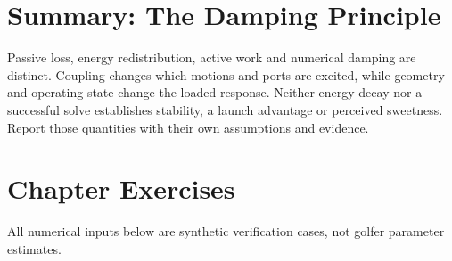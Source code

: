 \section{Summary: The Damping
Principle}\label{summary-the-damping-principle}

Passive loss, energy redistribution, active work and numerical damping are distinct. Coupling changes which motions and ports are excited, while geometry and operating state change the loaded response. Neither energy decay nor a successful solve establishes stability, a launch advantage or perceived sweetness. Report those quantities with their own assumptions and evidence.

\section{Chapter Exercises}\label{chapter-exercises}

All numerical inputs below are synthetic verification cases, not golfer parameter estimates.

